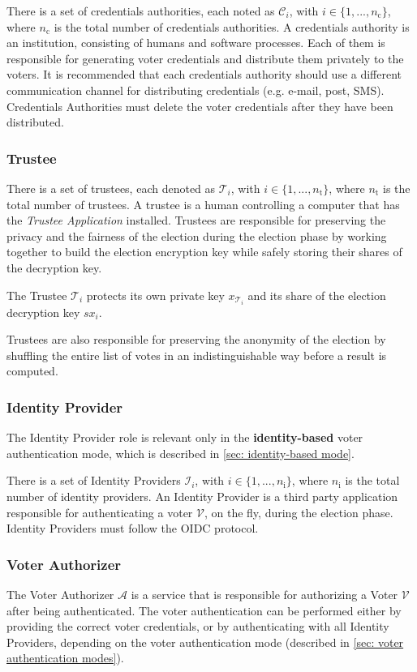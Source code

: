There is a set of credentials authorities, each noted as $\mathcal{C}_i$, with \( i \in \{ 1, ..., n_\mathrm{c} \} \), where $n_\mathrm{c}$ is the total number of credentials authorities. A credentials authority is an institution, consisting of humans and software processes. Each of them is responsible for generating voter credentials and distribute them privately to the voters. It is recommended that each credentials authority should use a different communication channel for distributing credentials (e.g. e-mail, post, SMS). Credentials Authorities must delete the voter credentials after they have been distributed.


\subsubsection{Trustee}
There is a set of trustees, each denoted as $\mathcal{T}_i$, with \( i \in \{ 1, ..., n_\mathrm{t} \} \), where $n_\mathrm{t}$ is the total number of trustees. A trustee is a human controlling a computer that has the \textit{Trustee Application} installed. Trustees are responsible for preserving the privacy and the fairness of the election during the election phase by working together to build the election encryption key while safely storing their shares of the decryption key.

The Trustee $\mathcal{T}_i$ protects its own private key $x_{\mathcal{T}_i}$ and its share of the election decryption key $sx_i$.

Trustees are also responsible for preserving the anonymity of the election by shuffling the entire list of votes in an indistinguishable way before a result is computed.


\subsubsection{Identity Provider}
The Identity Provider role is relevant only in the \textbf{identity-based} voter authentication mode, which is described in \cref{sec: identity-based mode}.
    
There is a set of Identity Providers $\mathcal{I}_i$, with $i \in \{ 1, ..., n_\mathrm{i} \}$, where $n_\mathrm{i}$ is the total number of identity providers. An Identity Provider is a third party application responsible for authenticating a voter $\mathcal{V}$, on the fly, during the election phase. Identity Providers must follow the OIDC protocol.


\subsubsection{Voter Authorizer} 
The Voter Authorizer $\mathcal{A}$ is a service that is responsible for authorizing a Voter $\mathcal{V}$ after being authenticated. The voter authentication can be performed either by providing the correct voter credentials, or by authenticating with all Identity Providers, depending on the voter authentication mode (described in \cref{sec: voter authentication modes}).

